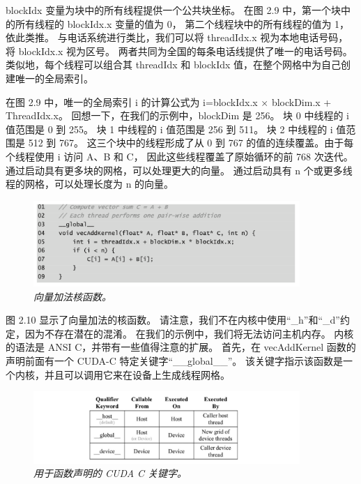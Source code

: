 blockIdx 变量为块中的所有线程提供一个公共块坐标。 在图 2.9 中，第一个块中的所有线程的 blockIdx.x 变量的值为 0，
第二个线程块中的所有线程的值为 1，依此类推。 与电话系统进行类比，我们可以将 threadIdx.x 视为本地电话号码，
将 blockIdx.x 视为区号。 两者共同为全国的每条电话线提供了唯一的电话号码。 
类似地，每个线程可以组合其 threadIdx 和 blockIdx 值，在整个网格中为自己创建唯一的全局索引。

在图 2.9 中，唯一的全局索引 i 的计算公式为 i=blockIdx.x × blockDim.x + ThreadIdx.x。 
回想一下，在我们的示例中，blockDim 是 256。 块 0 中线程的 i 值范围是 0 到 255。 
块 1 中线程的 i 值范围是 256 到 511。 块 2 中线程的 i 值范围是 512 到 767。 
这三个块中的线程形成了从 0 到 767 的值的连续覆盖。由于每个线程使用 i 访问 A、B 和 C，
因此这些线程覆盖了原始循环的前 768 次迭代。 通过启动具有更多块的网格，可以处理更大的向量。 
通过启动具有 n 个或更多线程的网格，可以处理长度为 n 的向量。

\begin{figure}[H]
	\centering
	\includegraphics[width=0.9\textwidth]{figs/F2.10.png}
	\caption{\textit{向量加法核函数。}}
\end{figure}

图 2.10 显示了向量加法的核函数。 请注意，我们不在内核中使用“\_h”和“\_d”约定，因为不存在潜在的混淆。 
在我们的示例中，我们将无法访问主机内存。 内核的语法是 ANSI C，并带有一些值得注意的扩展。 
首先，在 vecAddKernel 函数的声明前面有一个 CUDA-C 特定关键字“\_\_global\_\_”。 
该关键字指示该函数是一个内核，并且可以调用它来在设备上生成线程网格。

\begin{figure}[H]
	\centering
	\includegraphics[width=0.9\textwidth]{figs/F2.11.png}
	\caption{\textit{用于函数声明的 CUDA C 关键字。}}
\end{figure}

